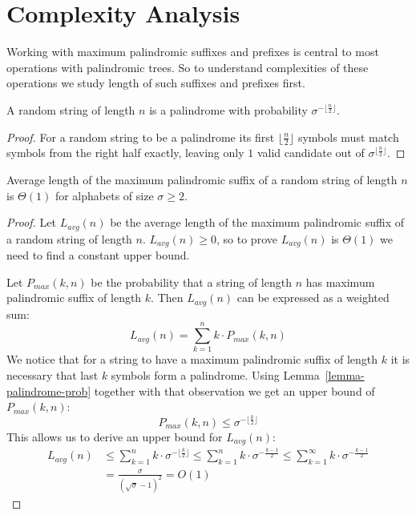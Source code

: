 \section{Complexity Analysis}

Working with maximum palindromic suffixes and prefixes
is central to most operations with palindromic trees.
So to understand complexities of these operations we
study length of such suffixes and prefixes first.

\begin{lemma}
\label{lemma-palindrome-prob}
  A random string of length $n$ is a palindrome with probability $\sigma^{- \lfloor\frac{n}{2}\rfloor}$.
\end{lemma}
\begin{proof}
  For a random string to be a palindrome its first $\lfloor\frac{n}{2}\rfloor$
  symbols must match symbols from the right half exactly, leaving only
  $1$ valid candidate out of $\sigma^{\lfloor\frac{n}{2}\rfloor}$.
\end{proof}

\begin{theorem}
  Average length of the maximum palindromic suffix
  of a random string of length $n$ is $\Theta(1)$
  for alphabets of size $\sigma \ge 2$.
\end{theorem}
\begin{proof}
  Let $L_{avg}(n)$ be the average length of the maximum palindromic suffix
  of a random string of length $n$.
  $L_{avg}(n) \ge 0$, so to prove $L_{avg}(n)$ is $\Theta(1)$ we need
  to find a constant upper bound.

  Let $P_{max}(k, n)$ be the probability that a string of length $n$
  has maximum palindromic suffix of length $k$.
  Then $L_{avg}(n)$ can be expressed as a weighted sum:
  $$
  L_{avg}(n) = \sum_{k=1}^{n} k \cdot P_{max}(k, n)
  $$
  We notice that for a string to have a maximum palindromic suffix
  of length $k$ it is necessary that last $k$ symbols form a palindrome.
  Using Lemma~\ref{lemma-palindrome-prob} together with that observation
  we get an upper bound of $P_{max}(k, n)$:
  $$
  P_{max}(k, n) \le \sigma^{- \lfloor\frac{k}{2}\rfloor}
  $$
  This allows us to derive an upper bound for $L_{avg}(n)$:
  \begin{align*}
    L_{avg}(n)
      &\le \sum_{k=1}^{n} k \cdot \sigma^{- \lfloor\frac{k}{2}\rfloor}
       \le \sum_{k=1}^{n} k \cdot \sigma^{- \frac{k-1}{2}}
       \le \sum_{k=1}^{\infty} k \cdot \sigma^{- \frac{k-1}{2}} \\
      &= \frac{\sigma}{(\sqrt{\sigma} - 1)^2}
       = O(1)
  \end{align*}
\end{proof}

